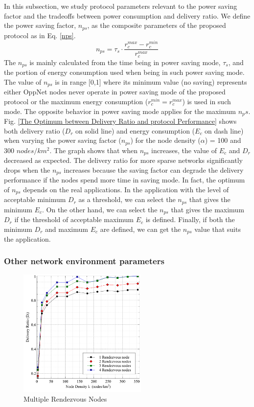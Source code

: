 \documentclass[conference]{IEEEtran}
\begin{document}
In this subsection, we study protocol parameters relevant to the power saving factor and the tradeoffs between power consumption and delivery ratio.
%
We define the power saving factor, $n_{ps}$, as the composite parameters of the proposed protocol as in Eq. \ref{nps}.
%
\begin{equation}
{ n }_{ ps }={ \tau  }_{ s }\cdot \frac { { r }_{ c }^{ max }-{ r }_{ c }^{ min } }{ { r }_{ c }^{ max } } 
\label{nps}
\end{equation}
The $n_{ps}$ is mainly calculated from the time being in power saving mode, $\tau_s$, and the portion of energy consumption used when being in such power saving mode.
%
The value of $n_{ps}$ is in range [0,1] where its minimum value (no saving) represents either OppNet nodes never operate in power saving mode of the proposed protocol or the maximum energy consumption ($r_c^{min} = r_c^{max}$) is used in such mode.
%
The opposite behavior in power saving mode applies for the maximum $n_ps$.
%
Fig. \ref{The Optimum between Delivery Ratio and protocol Performance} shows both delivery ratio ($D_r$ on solid line) and energy consumption ($E_c$ on dash line) when varying the power saving factor ($n_{ps}$) for the node density ($\alpha$) = 100 and 300 $nodes/km^2$.
%
The graph shows that when $n_{ps}$ increases, the value of $E_c$ and $D_r$ decreased as expected.
%
The delivery ratio for more sparse networks significantly drops when the $n_{ps}$ increases because the saving factor can degrade the delivery performance if the nodes spend more time in saving mode.
%
In fact, the optimum of $n_{ps}$ depends on the real applications.
%
In the application with the level of acceptable minimum $D_r$ as a threshold, we can select the $n_{ps}$ that gives the minimum $E_c$.
%
On the other hand, we can select the $n_{ps}$ that gives the maximum $D_r$ if the threshold of acceptable maximum $E_c$ is defined.
%
Finally, if both the minimum $D_r$ and maximum $E_c$ are defined, we can get the $n_{ps}$ value that suits the application.

\subsubsection{Other network environment parameters}

\begin{figure}[!t]
	\centering
	\includegraphics[width=2.5in]{Graphs/MultipleRVs.pdf}
	\caption{Multiple Rendezvous Nodes}
	\label{Multiple Rendezvous Nodes}
\end{figure}
\end{document}
